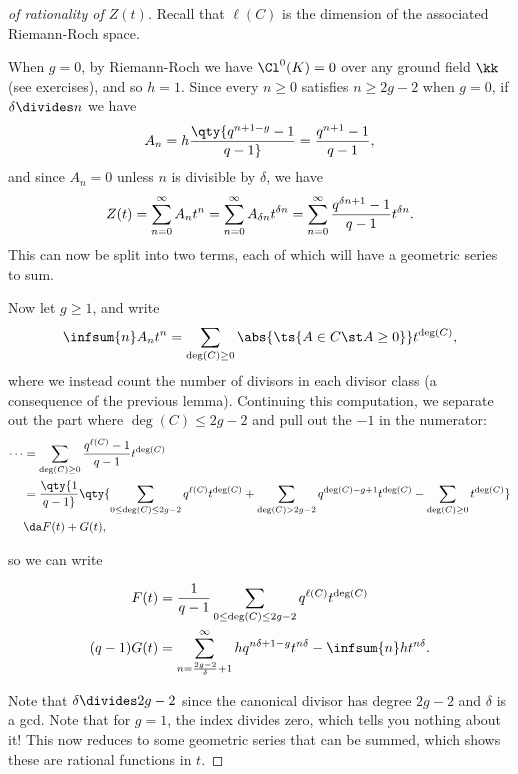\begin{proof}[of rationality of $Z(t)$]

Recall that \(\ell(C)\) is the dimension of the associated Riemann-Roch
space.

When \(g=0\), by Riemann-Roch we have \(\Cl^0(K) = 0\) over any ground
field \(\kk\) (see exercises), and so \(h=1\). Since every \(n\geq 0\)
satisfies \(n\geq 2g-2\) when \(g=0\), if \(\delta\divides n\) we have
\begin{align*}  
A_n = h \qty{ q^{n+1 - g} - 1 \over q-1} = {q^{n+1} - 1 \over q-1}
,\end{align*} and since \(A_n=0\) unless \(n\) is divisible by
\(\delta\), we have
\begin{align*}  
Z(t) = \sum_{n=0}^\infty A_n t^n = \sum_{n=0}^{\infty} A_{\delta n} t^{\delta n} = \sum_{n=0}^\infty {q^{\delta n + 1} -1 \over q-1} t^{\delta n}
.\end{align*} This can now be split into two terms, each of which will
have a geometric series to sum.

Now let \(g\geq 1\), and write
\begin{align*}  
\infsum{n} A_n t^n = \sum_{\deg(C) \geq 0} \abs{\ts{ A\in C \st A\geq 0}}t^{\deg(C)}
,\end{align*} where we instead count the number of divisors in each
divisor class (a consequence of the previous lemma). Continuing this
computation, we separate out the part where \(\deg(C) \leq 2g-2\) and
pull out the \(-1\) in the numerator:
\begin{align*}  
\cdots 
&= \sum_{\deg(C) \geq 0} {q^{\ell(C)} - 1 \over q - 1}t^{\deg(C)} \\
&= \qty{1\over q-1} \qty{ \sum_{0\leq \deg(C) \leq 2g-2} q^{\ell(C)} t^{\deg(C)} 
+ \sum_{\deg(C) > 2g-2} q^{\deg(C) - g + 1} t^{\deg(C)} - \sum_{\deg(C) \geq 0} t^{\deg(C)}
} \\
&\da F(t) + G(t)
,\end{align*}

so we can write

\begin{align*}  
F(t) &= {1\over q-1} \sum_{0\leq \deg(C) \leq 2g-2} q^{\ell(C)} t^{\deg(C)}
\\
(q-1)G(t) &= \sum_{n = {2g-2 \over \delta} + 1}^\infty  h q^{n\delta + 1 - g} t^{n\delta}  - \infsum{n} ht^{n\delta}
.\end{align*}

Note that \(\delta\divides 2g-2\) since the canonical divisor has degree
\(2g-2\) and \(\delta\) is a gcd. Note that for \(g=1\), the index
divides zero, which tells you nothing about it! This now reduces to some
geometric series that can be summed, which shows these are rational
functions in \(t\).

\end{proof}

